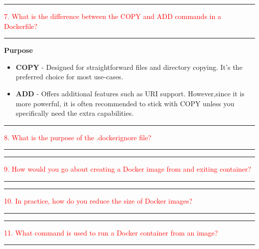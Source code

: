 \documentclass{article}
\begin{document}
\noindent
{\color{red} \rule{\linewidth}{0.5mm}}
\textcolor{red}{7. What is the difference between the COPY and ADD commands in a Dockerfile?} \\
\noindent
{\color{red} \rule{\linewidth}{0.5mm}}
\textbf{Purpose} \\
\begin{itemize}
    \item \textbf{COPY} - Designed for straightforward files and directory copying. It's the preferred choice for most use-cases. 
    \item \textbf{ADD} - Offers additional features such as URI support. However,since it is more powerful, it is often recommended to stick with COPY unless you specifically need the extra capabilities. 
\end{itemize}

\noindent
{\color{red} \rule{\linewidth}{0.5mm}}
\textcolor{red}{8. What is the purpose of the .dockerignore file?} \\
\noindent
{\color{red} \rule{\linewidth}{0.5mm}}

\noindent
{\color{red} \rule{\linewidth}{0.5mm}}
\textcolor{red}{9. How would you go about creating a Docker image from and exiting container?} \\
\noindent
{\color{red} \rule{\linewidth}{0.5mm}}

\noindent
{\color{red} \rule{\linewidth}{0.5mm}}
\textcolor{red}{10. In practice, how do you reduce the size of Docker images?} \\
\noindent
{\color{red} \rule{\linewidth}{0.5mm}}


\noindent
{\color{red} \rule{\linewidth}{0.5mm}}
\textcolor{red}{11. What command is used to run a Docker container from an image?} \\
\noindent
{\color{red} \rule{\linewidth}{0.5mm}}
\end{document}
